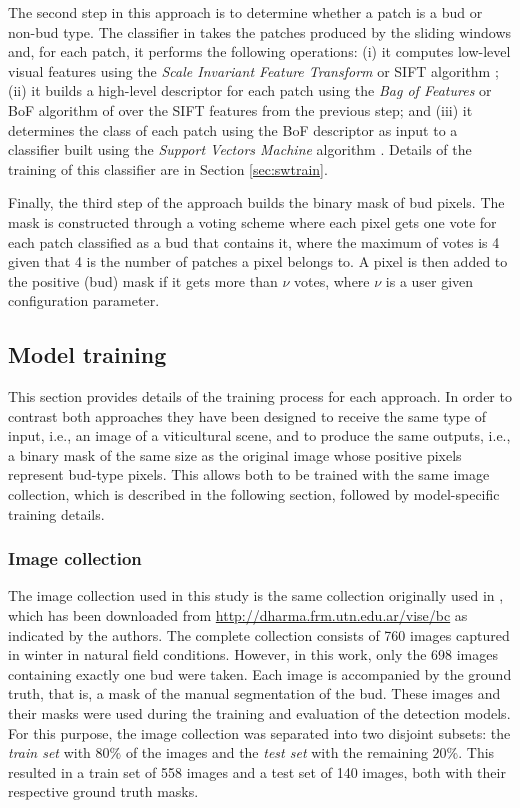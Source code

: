 \documentclass[a4paper,authoryear,review]{elsarticle}
\begin{document}
	The second step in this approach is to determine whether a patch is a bud or non-bud type. The classifier in  \citet{perez2017image} takes the patches produced by the sliding windows and, for each patch, it performs the following operations: (i) it computes low-level visual features using the \emph{Scale Invariant Feature Transform} or SIFT algorithm \citep{lowe2004distinctive}; (ii) it builds a high-level descriptor for each patch using the \emph{Bag of Features} or BoF algorithm of \citet{csurka2004visual} over  the SIFT features from the previous step; and (iii) it determines the class of each patch using the BoF descriptor as input to a  classifier built using the \emph{Support Vectors Machine} algorithm \citep{vapnik2013nature}. Details of the training of this classifier are in Section \ref{sec:swtrain}.
	
	Finally, the third step of the approach builds the binary mask of bud pixels. The mask is constructed through a voting scheme where each pixel gets one vote for each patch classified as a bud that contains it, where the maximum of votes is 4 given that 4 is the number of patches a pixel belongs to. A pixel is then added to the positive (bud) mask if it gets more than $\nu$ votes, where $\nu$ is a user given configuration parameter.
	
	\subsection{Model training}
	\label{sec:train}
	
	This section provides details of the training process for each approach. In order to contrast both approaches they have been designed to receive the same type of input, i.e., an image of a viticultural scene, and to produce the same outputs, i.e., a binary mask of the same size as the original image whose positive pixels represent bud-type pixels. This allows both to be trained with the same image collection, which is described in the following section, followed by model-specific training details.
	
	\subsubsection{Image collection}
	\label{sec:collection}
	
	The image collection used in this study is the same collection originally used in \citet{perez2017image}, which has been downloaded from \url{
		http://dharma.frm.utn.edu.ar/vise/bc} as indicated by the authors. The complete collection consists of 760 images captured in winter in natural field conditions. However, in this work, only the 698 images containing exactly one bud were taken. Each image is accompanied by the ground truth, that is, a mask of the  manual segmentation of the bud. These images and their masks were used during the training and evaluation of the detection models. For this purpose, the image collection was separated into two disjoint subsets: the \emph{train set} with $80\%$ of the images and the \emph{test set} with the remaining  $20\%$. This resulted in a train set of 558 images and a test set of 140 images, both with their respective ground truth masks.
\end{document}
